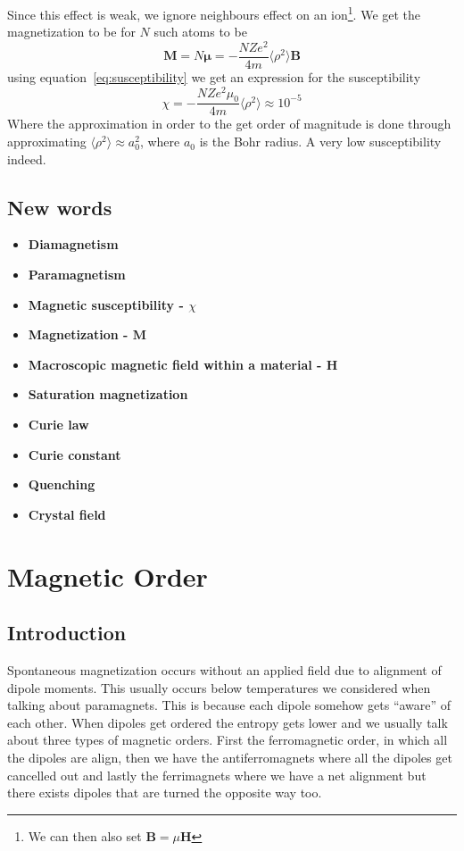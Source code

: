 \documentclass[11pt]{article}
\begin{document}
Since this effect is weak, we ignore neighbours effect on an ion\footnote{We can then also set $\pmb{B} = \mu \pmb{H}$}. We get the magnetization to be for $N$ such atoms to be
\begin{equation}
	\pmb{M} = N\pmb{\mu} = - \frac{NZe^2}{4m} \langle \rho^2 \rangle \pmb{B}
\end{equation}
using equation~\ref{eq:susceptibility} we get an expression for the susceptibility 
\begin{equation}
	\chi = - \frac{NZe^2 \mu_0}{4m} \langle \rho^2 \rangle \approx 10^{-5}
\end{equation}
Where the approximation in order to the get order of magnitude is done through approximating $\langle \rho^2 \rangle \approx a_0^2$, where $a_0$ is the Bohr radius. A very low susceptibility indeed.
\newpage
\subsection{New words}
\begin{itemize}
	\item \textbf{Diamagnetism}
	\item \textbf{Paramagnetism}
	\item \textbf{Magnetic susceptibility - $\chi$}
	\item \textbf{Magnetization - $\mathbf{M}$}
	\item \textbf{Macroscopic magnetic field within a material - $\mathbf{H}$}
	\item \textbf{Saturation magnetization}
	\item \textbf{Curie law}
	\item \textbf{Curie constant}
	\item \textbf{Quenching}
	\item \textbf{Crystal field}
\end{itemize}

\newpage
\section{Magnetic Order}
\subsection{Introduction}
Spontaneous magnetization occurs without an applied field due to alignment of dipole moments. This usually occurs below temperatures we considered when talking about paramagnets. This is because each dipole somehow gets ``aware'' of each other. When dipoles get ordered the entropy gets lower and we usually talk about three types  of magnetic orders. First the ferromagnetic order, in which all the dipoles are align, then we have the antiferromagnets where all the dipoles get cancelled out and lastly the ferrimagnets where we have a net alignment but there exists dipoles that are turned the opposite way too.
\end{document}
